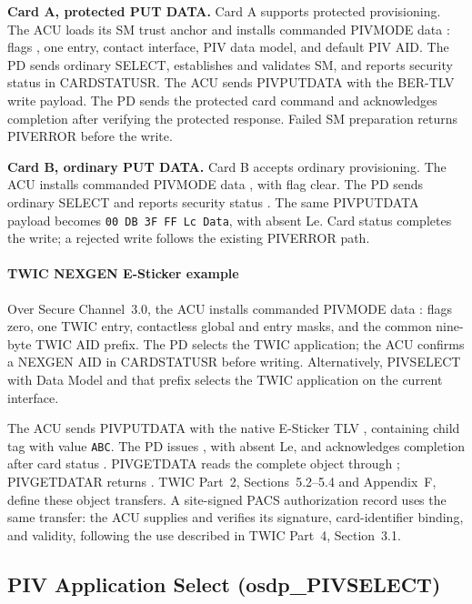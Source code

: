 \textbf{Card A, protected PUT DATA.} Card A supports protected provisioning.
The ACU loads its SM trust anchor and installs commanded PIVMODE data
: flags , one entry, contact interface,
PIV data model, and default PIV AID. The PD sends ordinary SELECT, establishes
and validates SM, and reports security status  in CARDSTATUSR.
The ACU sends PIVPUTDATA with the BER-TLV write payload. The PD sends the
protected card command and acknowledges completion after verifying the protected
 response. Failed SM preparation returns PIVERROR 
before the write.

\textbf{Card B, ordinary PUT DATA.} Card B accepts ordinary provisioning.
The ACU installs commanded PIVMODE data , with flag
 clear. The PD sends ordinary SELECT and reports security status
. The same PIVPUTDATA payload becomes
\texttt{00 DB 3F FF Lc Data}, with absent Le. Card status 
completes the write; a rejected write follows the existing PIVERROR path.

\paragraph{TWIC NEXGEN E-Sticker example}
Over Secure Channel~3.0, the ACU installs commanded PIVMODE data
: flags zero, one TWIC entry,
contactless global and entry masks, and the common nine-byte TWIC AID prefix.
The PD selects the TWIC application; the ACU confirms a NEXGEN AID in
CARDSTATUSR before writing. Alternatively, PIVSELECT with Data Model
 and that prefix selects the TWIC application on the current interface.

The ACU sends PIVPUTDATA with the native E-Sticker TLV
, containing child tag  with value
\texttt{ABC}. The PD issues , with absent
Le, and acknowledges completion after card status .
PIVGETDATA  reads the complete object through
; PIVGETDATAR returns
. TWIC Part~2, Sections~5.2--5.4 and Appendix~F,
define these object transfers. A site-signed PACS authorization record uses the
same transfer: the ACU supplies and verifies its signature, card-identifier binding,
and validity, following the use described in TWIC Part~4, Section~3.1.

\subsection{PIV Application Select (osdp\_PIVSELECT)}


